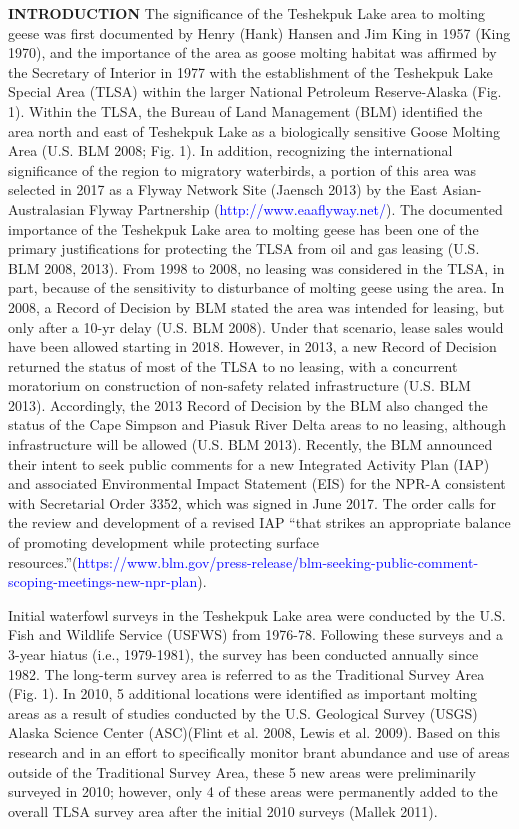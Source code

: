 \documentclass[]{article}
\begin{document}
\textbf{INTRODUCTION}\break
The significance of the Teshekpuk Lake area to molting geese was first
documented by Henry (Hank) Hansen and Jim King in 1957 (King 1970), and
the importance of the area as goose molting habitat was affirmed by the
Secretary of Interior in 1977 with the establishment of the Teshekpuk
Lake Special Area (TLSA) within the larger National Petroleum
Reserve-Alaska (Fig. 1). Within the TLSA, the Bureau of Land Management
(BLM) identified the area north and east of Teshekpuk Lake as a
biologically sensitive Goose Molting Area (U.S. BLM 2008; Fig. 1). In
addition, recognizing the international significance of the region to
migratory waterbirds, a portion of this area was selected in 2017 as a
Flyway Network Site (Jaensch 2013) by the East Asian-Australasian Flyway
Partnership (\textcolor{blue}{http://www.eaaflyway.net/}). The
documented importance of the Teshekpuk Lake area to molting geese has
been one of the primary justifications for protecting the TLSA from oil
and gas leasing (U.S. BLM 2008, 2013). From 1998 to 2008, no leasing was
considered in the TLSA, in part, because of the sensitivity to
disturbance of molting geese using the area. In 2008, a Record of
Decision by BLM stated the area was intended for leasing, but only after
a 10-yr delay (U.S. BLM 2008). Under that scenario, lease sales would
have been allowed starting in 2018. However, in 2013, a new Record of
Decision returned the status of most of the TLSA to no leasing, with a
concurrent moratorium on construction of non-safety related
infrastructure (U.S. BLM 2013). Accordingly, the 2013 Record of Decision
by the BLM also changed the status of the Cape Simpson and Piasuk River
Delta areas to no leasing, although infrastructure will be allowed (U.S.
BLM 2013). Recently, the BLM announced their intent to seek public
comments for a new Integrated Activity Plan (IAP) and associated
Environmental Impact Statement (EIS) for the NPR-A consistent with
Secretarial Order 3352, which was signed in June 2017. The order calls
for the review and development of a revised IAP ``that strikes an
appropriate balance of promoting development while protecting surface
resources.''(\textcolor{blue}{https://www.blm.gov/press-release/blm-seeking-public-comment-scoping-meetings-new-npr-plan}).

Initial waterfowl surveys in the Teshekpuk Lake area were conducted by
the U.S. Fish and Wildlife Service (USFWS) from 1976-78. Following these
surveys and a 3-year hiatus (i.e., 1979-1981), the survey has been
conducted annually since 1982. The long-term survey area is referred to
as the Traditional Survey Area (Fig. 1). In 2010, 5 additional locations
were identified as important molting areas as a result of studies
conducted by the U.S. Geological Survey (USGS) Alaska Science Center
(ASC)(Flint et al. 2008, Lewis et al. 2009). Based on this research and
in an effort to specifically monitor brant abundance and use of areas
outside of the Traditional Survey Area, these 5 new areas were
preliminarily surveyed in 2010; however, only 4 of these areas were
permanently added to the overall TLSA survey area after the initial 2010
surveys (Mallek 2011).
\end{document}
